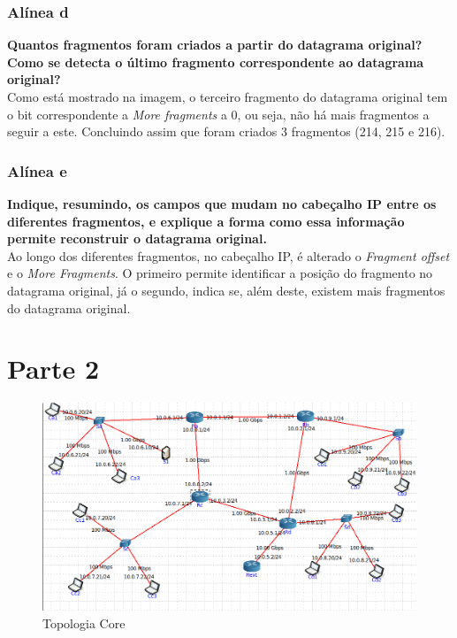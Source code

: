 \documentclass[a4paper]{report}
\begin{document}
\subsection{Alínea d}
\textbf{Quantos fragmentos foram criados a partir do datagrama original?
Como se detecta o último fragmento correspondente ao datagrama original?}\\
Como está mostrado na imagem, o terceiro fragmento do datagrama original
tem o bit correspondente a \textit{More fragments} a 0, ou seja, não há mais 
fragmentos a seguir a este. Concluindo assim que foram criados 3 fragmentos 
(214, 215 e 216).

\subsection{Alínea e}
\textbf{Indique, resumindo, os campos que mudam no cabeçalho IP entre 
os diferentes fragmentos, e explique a forma como essa informação permite
reconstruir o datagrama original.}\\
Ao longo dos diferentes fragmentos, no cabeçalho IP, é alterado o
\textit{Fragment offset} e o \textit{More Fragments}. O primeiro permite
identificar a posição do fragmento no datagrama original, já o segundo, indica
se, além deste, existem mais fragmentos do datagrama original.


\chapter{Parte 2}

\begin{figure}[H]
    \centering 
    \includegraphics[width=\textwidth]{images/topologiaCore.png}
    \caption{Topologia Core}
    \label{fig:topologiaCore}
\end{figure}
\end{document}
